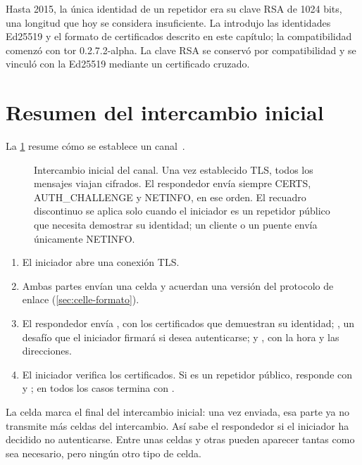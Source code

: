 \begin{storia}[De RSA a Ed25519]
Hasta 2015, la única identidad de un repetidor era su clave RSA de 1024 bits, una longitud que hoy se considera insuficiente. La  introdujo las identidades Ed25519 y el formato de certificados descrito en este capítulo; la compatibilidad comenzó con tor 0.2.7.2-alpha. La clave RSA se conservó por compatibilidad y se vinculó con la Ed25519 mediante un certificado cruzado.
\end{storia}

\section{Resumen del intercambio inicial}\label{sec:canale-handshake}

La \cref{fig:handshake-canale} resume cómo se establece un canal~.

\begin{figure}[htbp]
\centering

\caption{Intercambio inicial del canal. Una vez establecido TLS, todos los mensajes viajan cifrados. El respondedor envía siempre CERTS, AUTH\_CHALLENGE y NETINFO, en ese orden. El recuadro discontinuo se aplica solo cuando el iniciador es un repetidor público que necesita demostrar su identidad; un cliente o un puente envía únicamente NETINFO.}
\label{fig:handshake-canale}
\end{figure}

\begin{enumerate}
  \item El iniciador abre una conexión TLS.
  \item Ambas partes envían una celda  y acuerdan una versión del protocolo de enlace (\cref{sec:celle-formato}).
  \item El respondedor envía , con los certificados que demuestran su identidad; , un desafío que el iniciador firmará si desea autenticarse; y , con la hora y las direcciones.
  \item El iniciador verifica los certificados. Si es un repetidor público, responde con  y ; en todos los casos termina con .
\end{enumerate}

La celda  marca el final del intercambio inicial: una vez enviada, esa parte ya no transmite más celdas del intercambio. Así sabe el respondedor si el iniciador ha decidido no autenticarse. Entre unas celdas y otras pueden aparecer tantas  como sea necesario, pero ningún otro tipo de celda.

